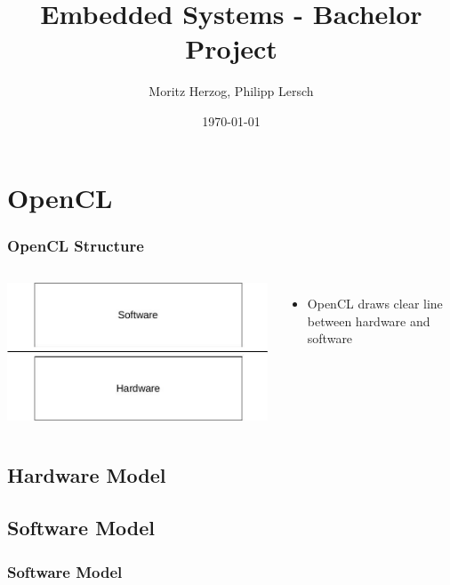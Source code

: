 \documentclass{beamer}
\title{Embedded Systems - Bachelor Project}
\author{Moritz Herzog, Philipp Lersch}
\date{\today}
\begin{document}
\maketitle


\section{OpenCL}
\begin{frame}
    \frametitle{OpenCL Structure}
    \begin{columns}
        \includegraphics[width=\textwidth]{res/HardwareSoftwareLayer.jpg}
        \begin{itemize}
            \item OpenCL draws clear line between hardware and software
        \end{itemize}
    \end{columns}
\end{frame}
\subsection{Hardware Model}
\begin{frame}
    
\end{frame}
\subsection{Software Model}
\begin{frame}
    \frametitle{Software Model}
\end{frame}
\end{document}
